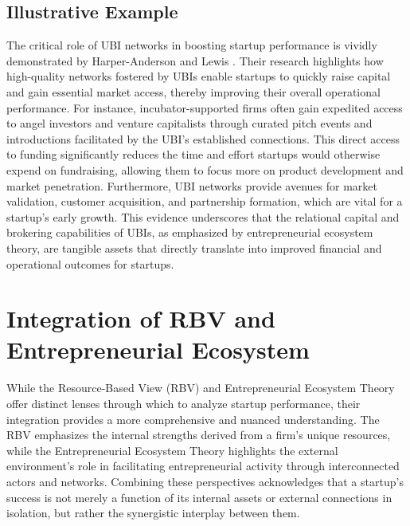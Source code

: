 \documentclass[../Main.tex]{subfiles}
\begin{document}
\subsection{Illustrative Example}
The critical role of UBI networks in boosting startup performance is vividly demonstrated by Harper-Anderson and Lewis \cite{harper2018makes}. Their research highlights how high-quality networks fostered by UBIs enable startups to quickly raise capital and gain essential market access, thereby improving their overall operational performance. For instance, incubator-supported firms often gain expedited access to angel investors and venture capitalists through curated pitch events and introductions facilitated by the UBI's established connections. This direct access to funding significantly reduces the time and effort startups would otherwise expend on fundraising, allowing them to focus more on product development and market penetration. Furthermore, UBI networks provide avenues for market validation, customer acquisition, and partnership formation, which are vital for a startup's early growth. This evidence underscores that the relational capital and brokering capabilities of UBIs, as emphasized by entrepreneurial ecosystem theory, are tangible assets that directly translate into improved financial and operational outcomes for startups.

\section{Integration of RBV and Entrepreneurial Ecosystem}

While the Resource-Based View (RBV) and Entrepreneurial Ecosystem Theory offer distinct lenses through which to analyze startup performance, their integration provides a more comprehensive and nuanced understanding. The RBV emphasizes the internal strengths derived from a firm's unique resources, while the Entrepreneurial Ecosystem Theory highlights the external environment's role in facilitating entrepreneurial activity through interconnected actors and networks. Combining these perspectives acknowledges that a startup's success is not merely a function of its internal assets or external connections in isolation, but rather the synergistic interplay between them.
\end{document}

